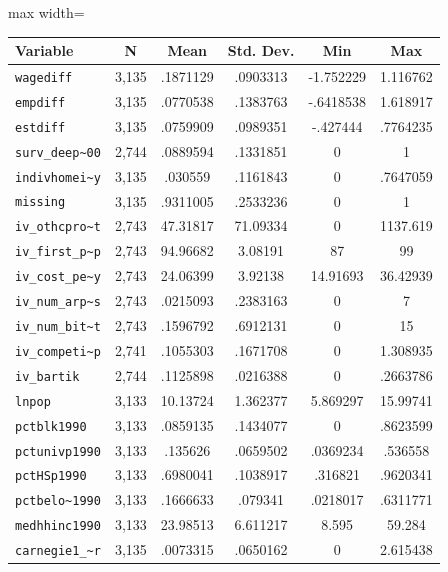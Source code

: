 \begin{adjustbox}{max width=\textwidth}
\begin{tabular}{lccccc}
\toprule
Variable & N & Mean & Std. Dev. & Min & Max \\
\midrule
\texttt{wagediff} & 3,135 & .1871129 & .0903313 & -1.752229 & 1.116762 \\
\texttt{empdiff} & 3,135 & .0770538 & .1383763 & -.6418538 & 1.618917 \\
\texttt{estdiff} & 3,135 & .0759909 & .0989351 & -.427444 & .7764235 \\
\texttt{surv\_deep\textasciitilde 00} & 2,744 & .0889594 & .1331851 & 0 & 1 \\
\texttt{indivhomei\textasciitilde y} & 3,135 & .030559 & .1161843 & 0 & .7647059 \\
\texttt{missing} & 3,135 & .9311005 & .2533236 & 0 & 1 \\
\texttt{iv\_othcpro\textasciitilde t} & 2,743 & 47.31817 & 71.09334 & 0 & 1137.619 \\
\texttt{iv\_first\_p\textasciitilde p} & 2,743 & 94.96682 & 3.08191 & 87 & 99 \\
\texttt{iv\_cost\_pe\textasciitilde y} & 2,743 & 24.06399 & 3.92138 & 14.91693 & 36.42939 \\
\texttt{iv\_num\_arp\textasciitilde s} & 2,743 & .0215093 & .2383163 & 0 & 7 \\
\texttt{iv\_num\_bit\textasciitilde t} & 2,743 & .1596792 & .6912131 & 0 & 15 \\
\texttt{iv\_competi\textasciitilde p} & 2,741 & .1055303 & .1671708 & 0 & 1.308935 \\
\texttt{iv\_bartik} & 2,744 & .1125898 & .0216388 & 0 & .2663786 \\
\texttt{lnpop} & 3,133 & 10.13724 & 1.362377 & 5.869297 & 15.99741 \\
\texttt{pctblk1990} & 3,133 & .0859135 & .1434077 & 0 & .8623599 \\
\texttt{pctunivp1990} & 3,133 & .135626 & .0659502 & .0369234 & .536558 \\
\texttt{pctHSp1990} & 3,133 & .6980041 & .1038917 & .316821 & .9620341 \\
\texttt{pctbelo\textasciitilde 1990} & 3,133 & .1666633 & .079341 & .0218017 & .6311771 \\
\texttt{medhhinc1990} & 3,133 & 23.98513 & 6.611217 & 8.595 & 59.284 \\
\texttt{carnegie1\_\textasciitilde r} & 3,135 & .0073315 & .0650162 & 0 & 2.615438 \\
\bottomrule
\end{tabular}
\end{adjustbox}
